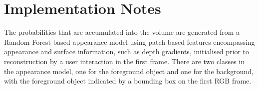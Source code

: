\section{Implementation Notes}
The probabilities that are accumulated into the volume are generated from a Random Forest based appearance model using patch based features encompassing 
appearance and surface information, such as depth gradients, initialised prior to reconstruction by a user interaction in the first frame. There are two 
classes in the appearance model, one for the foreground object and one for the background, with the foreground object indicated by a bounding box on the 
first RGB frame.